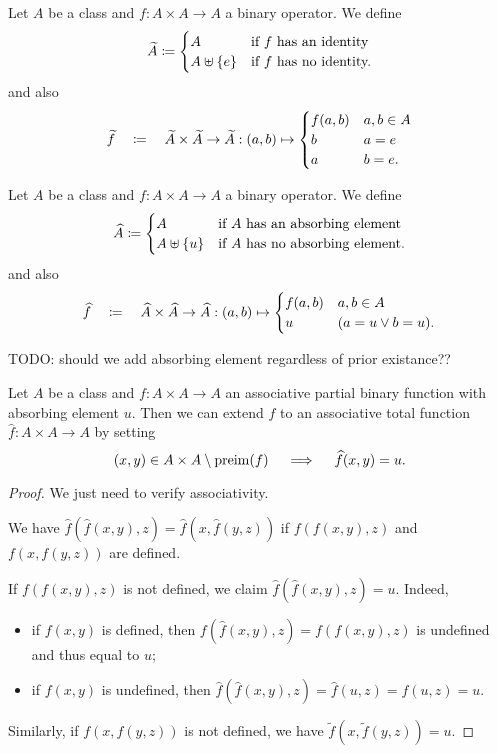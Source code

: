 \begin{definition}
Let $A$ be a class and $f: A\times A \to A$ a binary operator. We define
\[ \widetilde{A} \coloneqq \begin{cases}
A & \text{if $f$ has an identity} \\
A\uplus \{e\} & \text{if $f$ has no identity.}
\end{cases} \]
and also
\[ \widetilde{f} \quad\coloneqq\quad \widetilde{A}\times \widetilde{A}\to \widetilde{A}: (a,b) \mapsto \begin{cases}
f(a, b) & a,b\in A \\
b & a = e \\
a & b = e.
\end{cases} \]
\end{definition}

\begin{definition}
Let $A$ be a class and $f: A\times A \to A$ a binary operator. We define
\[ \widehat{A} \coloneqq \begin{cases}
A & \text{if $A$ has an absorbing element} \\
A\uplus \{u\} & \text{if $A$ has no absorbing element.}
\end{cases} \]
and also
\[ \widehat{f} \quad\coloneqq\quad \widehat{A}\times \widehat{A}\to \widehat{A}: (a,b) \mapsto \begin{cases}
f(a, b) & a,b\in A \\
u & (a = u \lor b = u).
\end{cases} \]
\end{definition}

TODO: should we add absorbing element regardless of prior existance??

\begin{lemma}
Let $A$ be a class and $f: A\times A \to A$ an associative partial binary function with absorbing element $u$. Then we can extend $f$ to an associative total function $\widehat{f}: A \times A \to A$
by setting
\[ (x,y) \in A\times A \setminus \operatorname{preim}(f) \quad\implies\quad \widehat{f}(x,y) = u. \]
\end{lemma}
\begin{proof}
We just need to verify associativity.

We have $\widehat{f}(\widehat{f}(x,y),z) = \widehat{f}(x,\widehat{f}(y,z))$ if $f(f(x,y),z)$ and $f(x,f(y,z))$ are defined.

If $f(f(x,y),z)$ is not defined, we claim $\widehat{f}(\widehat{f}(x,y),z) = u$. Indeed,
\begin{itemize}
\item if $f(x,y)$ is defined, then $f(\widehat{f}(x,y),z) = f(f(x,y),z)$ is undefined and thus equal to $u$;
\item if $f(x,y)$ is undefined, then $\widehat{f}(\widehat{f}(x,y),z) = \widehat{f}(u,z) = f(u,z) = u$.
\end{itemize}

Similarly, if $f(x, f(y, z))$ is not defined, we have $\widetilde{f}(x, \widetilde{f}(y, z)) = u$.
\end{proof}

